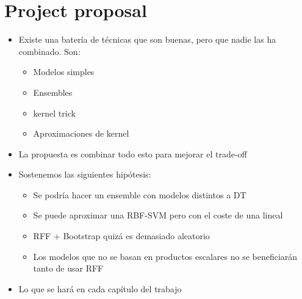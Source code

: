 \section{Project proposal}

\begin{note}
  \begin{itemize}
    \item Existe una batería de técnicas que son buenas, pero que nadie las
    ha combinado. Son:
    \begin{itemize}
      \item Modelos simples
      \item Ensembles
      \item kernel trick
      \item Aproximaciones de kernel
    \end{itemize}
    \item La propuesta es combinar todo esto para mejorar el trade-off
    \item Sostenemos las siguientes hipótesis:
    \begin{itemize}
      \item Se podría hacer un ensemble con modelos distintos a DT
      \item Se puede aproximar una RBF-SVM pero con el coste de una lineal
      \item RFF + Bootstrap quizá es demasiado aleatorio
      \item Los modelos que no se basan en productos escalares no se
      beneficiarán tanto de usar RFF
    \end{itemize}
    \item Lo que se hará en cada capítulo del trabajo
  \end{itemize}
\end{note}
